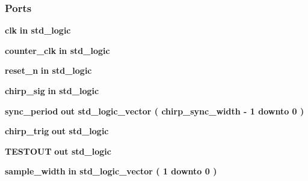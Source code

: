 \subsubsection*{Ports}
 \begin{DoxyCompactItemize}
\item 
{\bf clk}  {\bfseries {\bfseries \textcolor{keywordflow}{in}\textcolor{vhdlchar}{ }}} {\bfseries \textcolor{comment}{std\+\_\+logic}\textcolor{vhdlchar}{ }} 
\item 
{\bf counter\+\_\+clk}  {\bfseries {\bfseries \textcolor{keywordflow}{in}\textcolor{vhdlchar}{ }}} {\bfseries \textcolor{comment}{std\+\_\+logic}\textcolor{vhdlchar}{ }} 
\item 
{\bf reset\+\_\+n}  {\bfseries {\bfseries \textcolor{keywordflow}{in}\textcolor{vhdlchar}{ }}} {\bfseries \textcolor{comment}{std\+\_\+logic}\textcolor{vhdlchar}{ }} 
\item 
{\bf chirp\+\_\+sig}  {\bfseries {\bfseries \textcolor{keywordflow}{in}\textcolor{vhdlchar}{ }}} {\bfseries \textcolor{comment}{std\+\_\+logic}\textcolor{vhdlchar}{ }} 
\item 
{\bf sync\+\_\+period}  {\bfseries {\bfseries \textcolor{keywordflow}{out}\textcolor{vhdlchar}{ }}} {\bfseries \textcolor{comment}{std\+\_\+logic\+\_\+vector}\textcolor{vhdlchar}{ }\textcolor{vhdlchar}{(}\textcolor{vhdlchar}{ }\textcolor{vhdlchar}{ }\textcolor{vhdlchar}{ }\textcolor{vhdlchar}{ }{\bfseries {\bf chirp\+\_\+sync\+\_\+width}} \textcolor{vhdlchar}{-\/}\textcolor{vhdlchar}{ } \textcolor{vhdldigit}{1} \textcolor{vhdlchar}{ }\textcolor{keywordflow}{downto}\textcolor{vhdlchar}{ }\textcolor{vhdlchar}{ } \textcolor{vhdldigit}{0} \textcolor{vhdlchar}{ }\textcolor{vhdlchar}{)}\textcolor{vhdlchar}{ }} 
\item 
{\bf chirp\+\_\+trig}  {\bfseries {\bfseries \textcolor{keywordflow}{out}\textcolor{vhdlchar}{ }}} {\bfseries \textcolor{comment}{std\+\_\+logic}\textcolor{vhdlchar}{ }} 
\item 
{\bf T\+E\+S\+T\+O\+UT}  {\bfseries {\bfseries \textcolor{keywordflow}{out}\textcolor{vhdlchar}{ }}} {\bfseries \textcolor{comment}{std\+\_\+logic}\textcolor{vhdlchar}{ }} 
\item 
{\bf sample\+\_\+width}  {\bfseries {\bfseries \textcolor{keywordflow}{in}\textcolor{vhdlchar}{ }}} {\bfseries \textcolor{comment}{std\+\_\+logic\+\_\+vector}\textcolor{vhdlchar}{ }\textcolor{vhdlchar}{(}\textcolor{vhdlchar}{ }\textcolor{vhdlchar}{ } \textcolor{vhdldigit}{1} \textcolor{vhdlchar}{ }\textcolor{keywordflow}{downto}\textcolor{vhdlchar}{ }\textcolor{vhdlchar}{ } \textcolor{vhdldigit}{0} \textcolor{vhdlchar}{ }\textcolor{vhdlchar}{)}\textcolor{vhdlchar}{ }} 

\end{DoxyCompactItemize}
